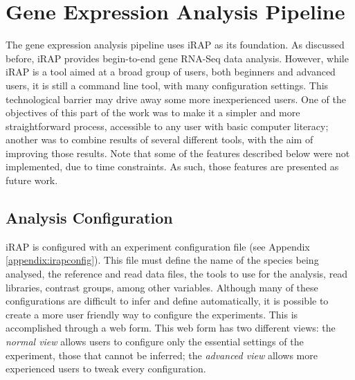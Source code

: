 \section{Gene Expression Analysis Pipeline}


The gene expression analysis pipeline uses iRAP \cite{irap} as its foundation.
As discussed before, iRAP provides begin-to-end gene RNA-Seq data analysis.
However, while iRAP is a tool aimed at a broad group of users, both beginners
and advanced users, it is still a command line tool, with many configuration
settings. This technological barrier may drive away some more inexperienced
users. One of the objectives of this part of the work was to make it a simpler
and more straightforward process, accessible to any user with basic computer
literacy; another was to combine results of several different tools, with the
aim of improving those results. Note that some of the features described below
were not implemented, due to time constraints. As such, those features are
presented as future work.

\subsection{Analysis Configuration}

iRAP is configured with an experiment configuration file (see Appendix
\ref{appendix:irapconfig}). This file must define the name of the species being
analysed, the reference and read data files, the tools to use for the analysis,
read libraries, contrast groups, among other variables. Although many of these
configurations are difficult to infer and define automatically, it is possible
to create a more user friendly way to configure the experiments. This is
accomplished through a web form. This web form has two different views: the
\emph{normal view} allows users to configure only the essential settings of the
experiment, those that cannot be inferred; the \emph{advanced view} allows more
experienced users to tweak every configuration.

